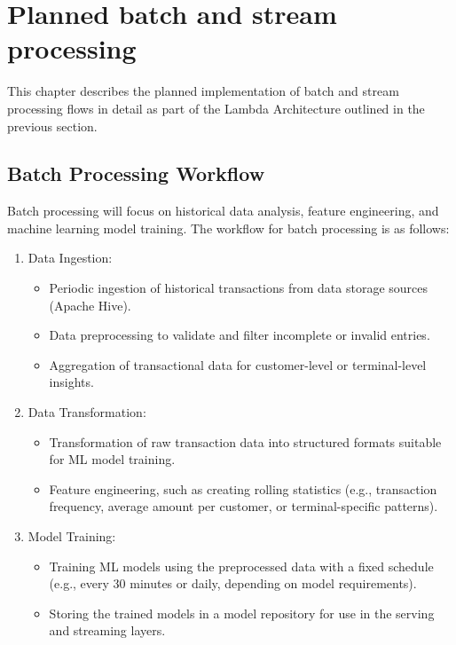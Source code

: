 \documentclass[12pt,a4paper, hidelinks]{article}
\begin{document}
\section{Planned batch and stream processing}

This chapter describes the planned implementation of batch and stream processing flows in detail as part of the Lambda Architecture outlined in the previous section.

\subsection{Batch Processing Workflow}
Batch processing will focus on historical data analysis, feature engineering, and machine learning model training. The workflow for batch processing is as follows:

\begin{enumerate}
    \item Data Ingestion:
        \begin{itemize}
            \item Periodic ingestion of historical transactions from data storage sources (Apache Hive).
            \item Data preprocessing to validate and filter incomplete or invalid entries.
            \item Aggregation of transactional data for customer-level or terminal-level insights.
        \end{itemize}
    \item Data Transformation:
        \begin{itemize}
            \item Transformation of raw transaction data into structured formats suitable for ML model training.
            \item Feature engineering, such as creating rolling statistics (e.g., transaction frequency, average amount per customer, or terminal-specific patterns).
        \end{itemize}
    \item Model Training:
        \begin{itemize}
            \item Training ML models using the preprocessed data with a fixed schedule (e.g., every 30 minutes or daily, depending on model requirements).
            \item Storing the trained models in a model repository for use in the serving and streaming layers.
        \end{itemize}
\end{enumerate}
\end{document}
